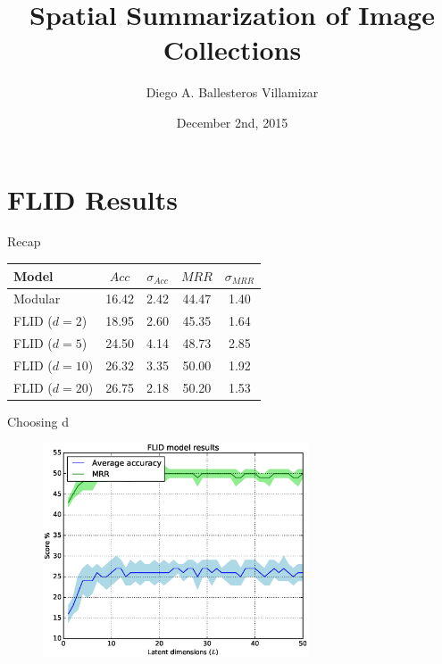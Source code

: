 \documentclass{beamer}
\title[M.Sc. Thesis 2015]{Spatial Summarization of Image Collections}
\author{Diego A. Ballesteros Villamizar}
\institute[ETHZ]{ETH Zürich}
\date{December 2nd, 2015}
\begin{document}
  \begin{frame}
    \titlepage
  \end{frame}
  
  \section{FLID Results}
  
  \begin{frame}{Recap}
    \begin{table}
      \begin{tabularx}{0.7\textwidth}{X|c|c|c|c}
        Model         & $Acc$ & $\sigma_{Acc}$ & $MRR$ & $\sigma_{MRR}$ \\
        \hline
        Modular       & 16.42 & 2.42           & 44.47 & 1.40 \\
        FLID ($d=2$)  & 18.95 & 2.60           & 45.35 & 1.64 \\
        FLID ($d=5$)  & 24.50 & 4.14           & 48.73 & 2.85 \\
        FLID ($d=10$) & 26.32 & 3.35           & 50.00 & 1.92 \\
        FLID ($d=20$) & 26.75 & 2.18           & 50.20 & 1.53 \\ 
      \end{tabularx}
    \end{table}
  \end{frame}
  
  \begin{frame}{Choosing d}
    \begin{figure}
      \includegraphics[width=0.7\textwidth]{submodular_score}
    \end{figure}
  \end{frame}
  
\end{document}
